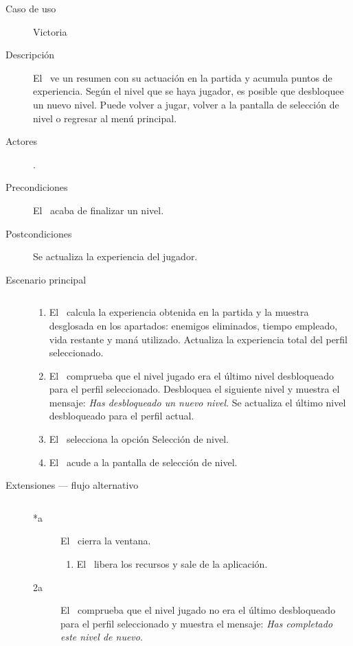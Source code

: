 \begin{description}
    \item [Caso de uso] Victoria
    \item [Descripción] El \jugador\ ve un resumen con su actuación en la
    partida y acumula puntos de experiencia. Según el nivel que se haya
    jugador, es posible que desbloquee un nuevo nivel. Puede volver a jugar,
    volver a la pantalla de selección de nivel o regresar al menú principal.
    \item [Actores] \jugador.
    \item [Precondiciones] El \jugador\ acaba de finalizar un nivel.
    \item [Postcondiciones] Se actualiza la experiencia del jugador.
    \item [Escenario principal] $\quad$
        \begin{enumerate}
            \item El \sistema\ calcula la experiencia obtenida en la
            partida y la muestra desglosada en los apartados: enemigos eliminados,
            tiempo empleado, vida restante y maná utilizado. Actualiza
            la experiencia total del perfil seleccionado.
            \item El \sistema\ comprueba que el nivel jugado era el último
            nivel desbloqueado para el perfil seleccionado. Desbloquea
            el siguiente nivel y muestra el mensaje: \emph{Has desbloqueado
            un nuevo nivel}. Se actualiza el último nivel desbloqueado
            para el perfil actual.
            \item El \jugador\ selecciona la opción Selección de nivel.
            \item El \sistema\ acude a la pantalla de selección de nivel.
        \end{enumerate}
    \item[Extensiones --- flujo alternativo] $\quad$
        \begin{description}
            \item [*a] El \jugador\ cierra la ventana.
                \begin{enumerate}
                    \item El \sistema\ libera los recursos y sale de la aplicación.
                \end{enumerate}
            \item [2a] El \sistema\ comprueba que el nivel jugado no era
            el último desbloqueado para el perfil seleccionado y muestra
            el mensaje: \emph{Has completado este nivel de nuevo}.

\end{description}
\end{description}
